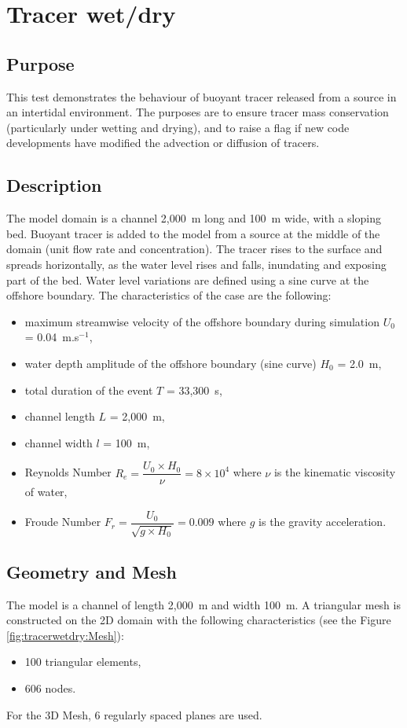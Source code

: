 \chapter{Tracer wet/dry}

\section{Purpose}
%
This test demonstrates the behaviour of buoyant tracer released from a source in an intertidal environment.
The purposes are to ensure tracer mass conservation (particularly under wetting and drying),
and to raise a flag if new code developments have modified the advection or diffusion of tracers.

\section{Description}
%
The model domain is a channel 2,000~m long and 100~m wide, with a sloping bed.
Buoyant tracer is added to the model from a source at the middle of the domain (unit flow rate and concentration). The tracer rises to the surface and spreads horizontally, as the water level rises and falls, inundating and exposing part of the bed. Water level variations are defined using a sine curve at the offshore boundary. The characteristics of the case are the following:
\begin{itemize}
  \itemsep0em
\item maximum streamwise velocity of the offshore boundary during simulation $U_0$ = 0.04~m.s$^{-1}$,
\item water depth amplitude of the offshore boundary (sine curve) $H_0$ = 2.0~m,
\item total duration of the event $T$ = 33,300~s,
\item channel length $L$ = 2,000~m,
\item channel width $l$ = 100~m,
\item Reynolds Number \textbf{$R_e = \dfrac{U_0 \times H_0}{\nu} =  8 \times 10^4$} where $\nu$ is the kinematic viscosity of water,
\item Froude Number \textbf{$F_r = \dfrac{U_0}{\sqrt{g \times H_0}} = 0.009$} where $g$ is the gravity acceleration.
\end{itemize}

\section{Geometry and Mesh}
The model is a channel of length 2,000~m and width 100~m. A triangular mesh is constructed on the 2D domain with the following characteristics (see the Figure \ref{fig:tracerwetdry:Mesh}):
\begin{itemize}
\itemsep0em
\item 100 triangular elements,
\item 606 nodes.
\end{itemize}
For the 3D Mesh, 6 regularly spaced planes are used.


